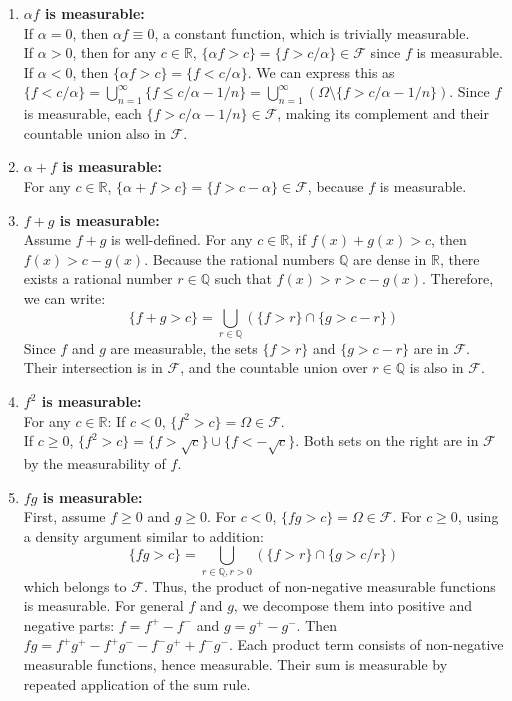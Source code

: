 \documentclass[11pt]{article}
\begin{document}
\begin{enumerate}
    \item \textbf{$\alpha f$ is measurable:} \\
    If $\alpha = 0$, then $\alpha f \equiv 0$, a constant function, which is trivially measurable. \\
    If $\alpha > 0$, then for any $c \in \mathbb{R}$, $\{\alpha f > c\} = \{f > c/\alpha\} \in \mathcal{F}$ since $f$ is measurable. \\
    If $\alpha < 0$, then $\{\alpha f > c\} = \{f < c/\alpha\}$. We can express this as $\{f < c/\alpha\} = \bigcup_{n=1}^{\infty} \{f \le c/\alpha - 1/n\} = \bigcup_{n=1}^{\infty} (\Omega \setminus \{f > c/\alpha - 1/n\})$. Since $f$ is measurable, each $\{f > c/\alpha - 1/n\} \in \mathcal{F}$, making its complement and their countable union also in $\mathcal{F}$.

    \item \textbf{$\alpha + f$ is measurable:} \\
    For any $c \in \mathbb{R}$, $\{\alpha + f > c\} = \{f > c - \alpha\} \in \mathcal{F}$, because $f$ is measurable.

    \item \textbf{$f + g$ is measurable:} \\
    Assume $f + g$ is well-defined. For any $c \in \mathbb{R}$, if $f(x) + g(x) > c$, then $f(x) > c - g(x)$. Because the rational numbers $\mathbb{Q}$ are dense in $\mathbb{R}$, there exists a rational number $r \in \mathbb{Q}$ such that $f(x) > r > c - g(x)$. Therefore, we can write:
    \[ \{f + g > c\} = \bigcup_{r \in \mathbb{Q}} (\{f > r\} \cap \{g > c - r\}) \]
    Since $f$ and $g$ are measurable, the sets $\{f > r\}$ and $\{g > c - r\}$ are in $\mathcal{F}$. Their intersection is in $\mathcal{F}$, and the countable union over $r \in \mathbb{Q}$ is also in $\mathcal{F}$.

    \item \textbf{$f^2$ is measurable:} \\
    For any $c \in \mathbb{R}$:
    If $c < 0$, $\{f^2 > c\} = \Omega \in \mathcal{F}$. \\
    If $c \ge 0$, $\{f^2 > c\} = \{f > \sqrt{c}\} \cup \{f < -\sqrt{c}\}$. Both sets on the right are in $\mathcal{F}$ by the measurability of $f$.

    \item \textbf{$fg$ is measurable:} \\
    First, assume $f \ge 0$ and $g \ge 0$. For $c < 0$, $\{fg > c\} = \Omega \in \mathcal{F}$. For $c \ge 0$, using a density argument similar to addition:
    \[ \{fg > c\} = \bigcup_{r \in \mathbb{Q}, r > 0} \left( \{f > r\} \cap \{g > c/r\} \right) \]
    which belongs to $\mathcal{F}$. Thus, the product of non-negative measurable functions is measurable.
    For general $f$ and $g$, we decompose them into positive and negative parts: $f = f^+ - f^-$ and $g = g^+ - g^-$. 
    Then $fg = f^+g^+ - f^+g^- - f^-g^+ + f^-g^-$. Each product term consists of non-negative measurable functions, hence measurable. Their sum is measurable by repeated application of the sum rule.


\end{enumerate}
\end{document}
